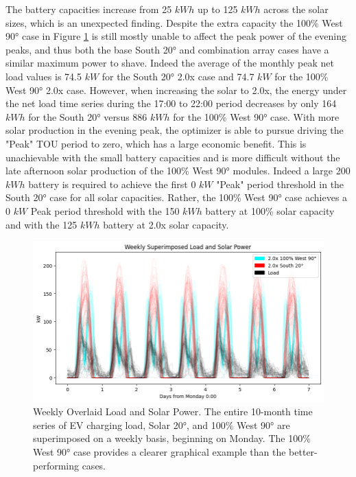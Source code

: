 \documentclass[conference]{IEEEtran}
\begin{document}
The battery capacities increase from 25 $kWh$ up to 125 $kWh$ across the solar sizes, which is an unexpected finding. Despite the extra capacity the 100\% West 90° case in Figure \ref{fig:weekly-load-solar} is still mostly unable to affect the peak power of the evening peaks, and thus both the base South 20° and combination array cases have a similar maximum power to shave. Indeed the average of the monthly peak net load values is 74.5 $kW$ for the South 20° 2.0x case and 74.7 $kW$ for the 100\% West 90° 2.0x case. However, when increasing the solar to 2.0x, the energy under the net load time series during the 17:00 to 22:00 period decreases by only 164 $kWh$ for the South 20° versus 886 $kWh$ for the 100\% West 90° case. With more solar production in the evening peak, the optimizer is able to pursue driving the "Peak" TOU period to zero, which has a large economic benefit. This is unachievable with the small battery capacities and is more difficult without the late afternoon solar production of the 100\% West 90° modules. Indeed a large 200 $kWh$ battery is required to achieve the first 0 $kW$ "Peak" period threshold in the South 20° case for all solar capacities. Rather, the 100\% West 90° case achieves a 0 $kW$ Peak period threshold with the 150 $kWh$ battery at 100\% solar capacity and with the 125 $kWh$ battery at 2.0x solar capacity.

\begin{figure}
    \centering
    \includegraphics[width=1\linewidth]{images/weekly load solar.png}
    \caption{Weekly Overlaid Load and Solar Power. The entire 10-month time series of EV charging load, Solar 20°, and 100\% West 90° are superimposed on a weekly basis, beginning on Monday. The 100\% West 90° case provides a clearer graphical example than the better-performing cases.}
    \label{fig:weekly-load-solar}
\end{figure}
\end{document}
